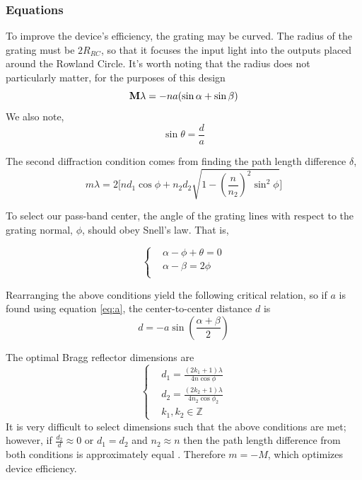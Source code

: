 \documentclass{article}
\begin{document}
\subsubsection{Equations}

To improve the device's efficiency, the grating may be curved. The radius of the grating must be $2 R_{RC}$, so that it focuses the input light into the outputs placed around the Rowland Circle. It's worth noting that the radius does not particularly matter, for the purposes of this design
\begin{equation}
    \vb{M \lambda} = - n a (\sin{\alpha} + \sin{\beta})
    \label{eq:a}
\end{equation}
                We also note, 
\begin{equation*}
    \sin{\theta} = \frac{d}{a}
\end{equation*}
                
The second diffraction condition comes from finding the path length difference $\delta$,
\begin{equation*}
    m \lambda = 2 \Bigg[ n d_1 \cos{\phi} + n_2 d_2 \sqrt{1-(\frac{n}{n_2})^2 \sin^2 \phi} \Bigg]
\end{equation*}

To select our pass-band center, the angle of the grating lines with respect to the grating normal, $\phi$, should obey Snell's law. That is,

\begin{equation*}
    \left \lbrace
    \begin{aligned}
        &\alpha - \phi + \theta = 0\\
        &\alpha - \beta = 2 \phi\\
    \end{aligned}
    \right.
\end{equation*}

Rearranging the above conditions yield the following critical relation, so if $a$ is found using equation \ref{eq:a}, the center-to-center distance $d$ is
\begin{equation}
d = -a \sin (\frac{\alpha + \beta}{2})
    \label{eq:d}
\end{equation}

The optimal Bragg reflector dimensions are
\begin{equation*}
    \left \lbrace
    \begin{aligned}
        &d_1 = \frac{(2 k_1 +1) \lambda}{4 n \cos{\phi}}\\
        &d_2 = \frac{(2 k_2 +1) \lambda}{4 n_2 \cos{\phi_2}}\\
        &k_1, k_2 \in \mathbb{Z}
    \end{aligned}
    \right.
\end{equation*}
It is very difficult to select dimensions such that the above conditions are met; however, if $\frac{d_2}{d} \approx 0$ or $d_1 = d_2$ and $n_2 \approx  n$ then the path length difference from both conditions is approximately equal \cite{Packirisamy2012Mono-OrderGrating, Pottier2014IntegratedInsulator}. Therefore $m=-M$, which optimizes device efficiency.
\end{document}
